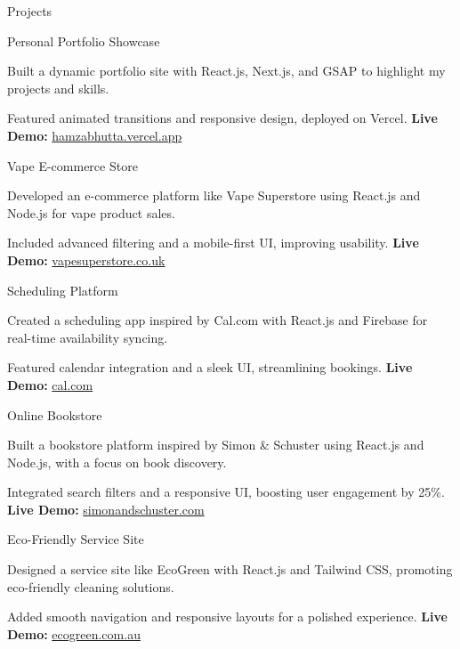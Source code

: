 \documentclass{resume}
\begin{document}
\begin{rSection}{Projects}

\begin{rSubsection}{Personal Portfolio Showcase}{}{}{}
\item Built a dynamic portfolio site with React.js, Next.js, and GSAP to highlight my projects and skills.
\item Featured animated transitions and responsive design, deployed on Vercel. \textbf{Live Demo:} \href{https://hamzabhutta.vercel.app}{hamzabhutta.vercel.app}
\end{rSubsection}

\begin{rSubsection}{Vape E-commerce Store}{}{}{}
\item Developed an e-commerce platform like Vape Superstore using React.js and Node.js for vape product sales.
\item Included advanced filtering and a mobile-first UI, improving usability. \textbf{Live Demo:} \href{https://www.vapesuperstore.co.uk}{vapesuperstore.co.uk}
\end{rSubsection}

\begin{rSubsection}{Scheduling Platform}{}{}{}
\item Created a scheduling app inspired by Cal.com with React.js and Firebase for real-time availability syncing.
\item Featured calendar integration and a sleek UI, streamlining bookings. \textbf{Live Demo:} \href{https://cal.com}{cal.com}
\end{rSubsection}

\begin{rSubsection}{Online Bookstore}{}{}{}
\item Built a bookstore platform inspired by Simon \& Schuster using React.js and Node.js, with a focus on book discovery.
\item Integrated search filters and a responsive UI, boosting user engagement by 25\%. \textbf{Live Demo:} \href{https://www.simonandschuster.com}{simonandschuster.com}
\end{rSubsection}
  
\begin{rSubsection}{Eco-Friendly Service Site}{}{}{}
\item Designed a service site like EcoGreen with React.js and Tailwind CSS, promoting eco-friendly cleaning solutions.
\item Added smooth navigation and responsive layouts for a polished experience. \textbf{Live Demo:} \href{https://ecogreen.com.au}{ecogreen.com.au}
\end{rSubsection}


\end{rSection}
\end{document}
